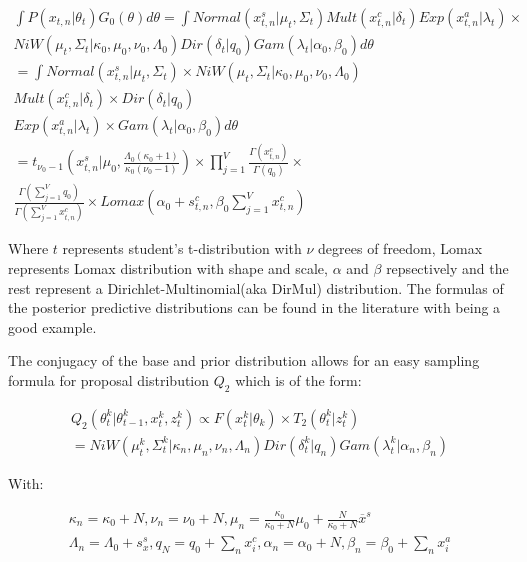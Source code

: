 \documentclass[twoside,hidelinks]{article}
\begin{document}
\begin{equation} \label{Q1}
	\begin{split}
		 	\int P(x_{t,n} | \theta_t )G_0(\theta) d\theta =
		 	\int Normal(x_{t,n}^s| \mu_t, \Sigma_t) Mult(x_{t,n}^c | \delta_t) Exp(x_{t,n}^a | \lambda_t) \times  \\ NiW( \mu_t, \Sigma_t | \kappa_0, \mu_0, \nu_0, \Lambda_0 ) Dir(\delta_t | q_0) Gam( \lambda_t | \alpha_0, \beta_0)  d\theta  \\
			= \int Normal(x_{t,n}^s| \mu_t, \Sigma_t) \times NiW( \mu_t, \Sigma_t | \kappa_0, \mu_0, \nu_0, \Lambda_0 )\\
			 Mult(x_{t,n}^c | \delta_t) \times Dir(\delta_t | q_0) \\
			 Exp(x_{t,n}^a | \lambda_t) \times Gam( \lambda_t | \alpha_0, \beta_0)  d\theta  \\
		 	= t_{\nu_0-1}( x_{t,n}^s | \mu_0, \frac{\Lambda_0(\kappa_0+1)}{\kappa_0(\nu_0-1)}) \times \prod_{j=1}^V \frac{\Gamma(x_{t,n}^c)}{\Gamma(q_0)} \times \\ \frac{\Gamma(\sum_{j=1}^V q_0)}{\Gamma(\sum_{j=1}^V x_{t,n}^c)} \times Lomax(\alpha_0 + s_{t,n}^c, \beta_0 \sum_{j=1}^V x_{t,n}^c)
 	\end{split}
\end{equation}

Where $t$ represents student's t-distribution with $\nu$ degrees of freedom, Lomax represents Lomax distribution with shape and scale, $\alpha$ and $\beta$ repsectively and the rest represent a Dirichlet-Multinomial(aka DirMul) distribution. The formulas of the posterior predictive distributions can be found in the literature with \cite{compendium} being a good example. 

The conjugacy of the base and prior distribution allows for an easy sampling formula for proposal distribution $Q_2$ which is of the form: 


\begin{equation} \label{Q_2}
\begin{split}
Q_2(\theta_t^k | \theta_{t-1}^k , x_t^k, z_t^k) \propto F( x_t^k | \theta_k) \times T_2(\theta_t^k | z_t^k) \\
= NiW( \mu_t^k, \Sigma_t^k | \kappa_n, \mu_n, \nu_n, \Lambda_n ) Dir(\delta_t^k | q_n) Gam(\lambda_t^k | \alpha_n, \beta_n)
\end{split}
\end{equation}

With:

\begin{equation} \label{udpates}
\begin{split}
\kappa_n = \kappa_0 + N ,
\nu_n = \nu_0 + N ,
\mu_n = \frac{\kappa_0}{\kappa_0 + N} \mu_0 +  \frac{N}{\kappa_0 + N} \overline{x}^s\\
\Lambda_n = \Lambda_0 + s_{x}^s,
q_N = q_0 +  \sum_n x_i^c,
\alpha_n = \alpha_0 +  N,
\beta_n = \beta_0 +  \sum_n x_i^a
\end{split}
\end{equation}
\end{document}
